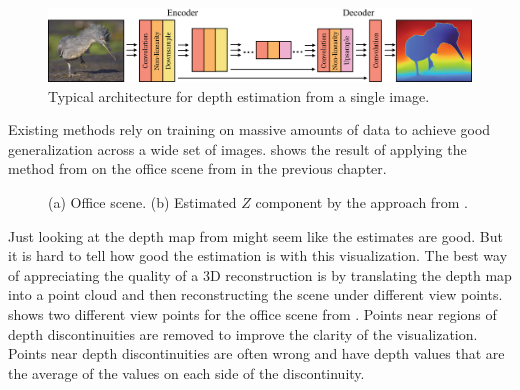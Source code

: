 \begin{figure}[t]
\centerline{
\includegraphics[width=1\linewidth]{figures/learning_3d/encoder_decoder_arch.eps}
}
\caption{Typical architecture for depth estimation from a single image\cite{Xian2018}. }
\label{fig:encoder_decoder_arch_depth}
\end{figure}

Existing methods rely on training on massive amounts of data to achieve good generalization across a wide set of images. \Fig{\ref{fig:office_midas}} shows the result of applying the method from \cite{Ranftl2022} on the office scene from \fig{\ref{fig:finding_depth_office}} in the previous chapter. 

\begin{figure}
\centerline{
}
\caption{(a) Office scene. (b) Estimated $Z$ component by the approach from \cite{Ranftl2021,Ranftl2022}.}
\label{fig:office_midas}
\end{figure}


Just looking at the depth map from  might seem like the estimates are good. But it is hard to tell how good the estimation is with this visualization. The best way of appreciating the quality of a 3D reconstruction is by translating the depth map into a point cloud and then reconstructing the scene under different view points. \Fig{\ref{fig:office_midas_point_cloud}} shows two different view points for the office scene from \fig{\ref{fig:office_midas}}. Points near regions of depth discontinuities are removed to improve the clarity of the visualization. Points near depth discontinuities are often wrong and have depth values that are the average of the values on each side of the discontinuity. 


